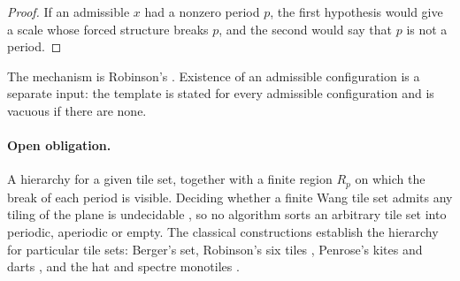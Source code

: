 \begin{proof}
If an admissible $x$ had a nonzero period $p$, the first hypothesis would give a scale whose forced
structure breaks $p$, and the second would say that $p$ is not a period.
\end{proof}

The mechanism is Robinson's \citep{Robinson1971}. Existence of an admissible configuration is a
separate input: the template is stated for every admissible configuration and is vacuous if there
are none.

\paragraph{Open obligation.} A hierarchy for a given tile set, together with a finite region $R_p$
on which the break of each period is visible. Deciding whether a finite Wang tile set admits any
tiling of the plane is undecidable \citep{Berger1966}, so no algorithm sorts an arbitrary tile set
into periodic, aperiodic or empty. The classical constructions establish the hierarchy for
particular tile sets: Berger's set, Robinson's six tiles \citep{Robinson1971}, Penrose's kites and
darts \citep{Penrose1974}, and the hat and spectre monotiles
\citep{SmithEtAl2023Hat,SmithEtAl2023Spectre}.
